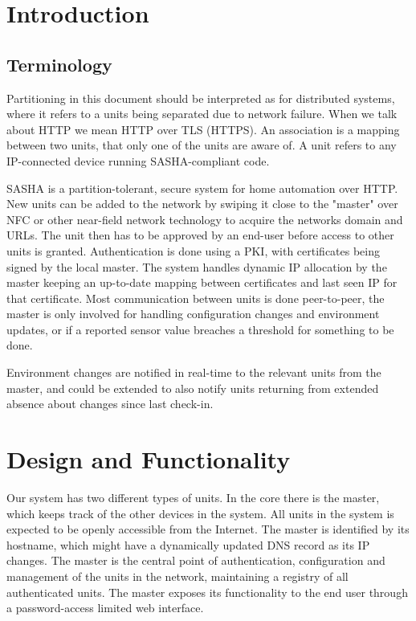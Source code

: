 \section{Introduction}


\subsection{Terminology}
Partitioning in this document should be interpreted as for distributed systems, where it refers to a units being separated due to network failure. When we talk about HTTP we mean HTTP over TLS (HTTPS). An association is a mapping between two units, that only one of the units are aware of. A unit refers to any IP-connected device running SASHA-compliant code.

SASHA is a partition-tolerant, secure system for home automation over HTTP. New units can be added to the network by swiping it close to the "master" over NFC or other near-field network technology to acquire the networks domain and URLs. The unit then has to be approved by an end-user before access to other units is granted. Authentication is done using a PKI, with certificates being signed by the local master. The system handles dynamic IP allocation by the master keeping an up-to-date mapping between certificates and last seen IP for that certificate. Most communication between units is done peer-to-peer, the master is only involved for handling configuration changes and environment updates, or if a reported sensor value breaches a threshold for something to be done.

Environment changes are notified in real-time to the relevant units from the master, and could be extended to also notify units returning from extended absence about changes since last check-in.

\section{Design and Functionality}

Our system has two different types of units. In the core there is the master, which keeps track of the other devices in the system. All units in the system is expected to be openly accessible from the Internet. The master is identified by its hostname, which might have a dynamically updated DNS record as its IP changes. The master is the central point of authentication, configuration and management of the units in the network, maintaining a registry of all authenticated units. The master exposes its functionality to the end user through a password-access limited web interface.

